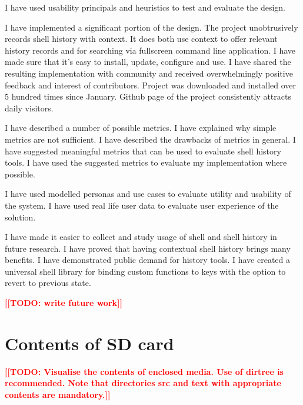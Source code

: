 \documentclass[thesis=M,english]{FITthesis}[2012/10/20]
\newcommand{\todotext}[1]{\textcolor{red}{\textbf{[[#1]]}}}
\begin{document}
\begin{conclusion}
I have used usability principals and heuristics to test and evaluate the design.

\par I have implemented a significant portion of the design. The project unobtrusively records shell history with context. It does both use context to offer relevant history records and for searching via fullscreen command line application.
I have made sure that it's easy to install, update, configure and use. I have shared the resulting implementation with community and received overwhelmingly positive feedback and interest of contributors. Project was downloaded and installed over 5 hundred times since January. Github page of the project consistently attracts daily visitors.  

\par I have described a number of possible metrics. I have explained why simple metrics are not sufficient. I have described the drawbacks of metrics in general. I have suggested meaningful metrics that can be used to evaluate shell history tools. I have used the suggested metrics to evaluate my implementation where possible. 

\par I have used modelled personas and use cases to evaluate utility and usability of the system.
I have used real life user data to evaluate user experience of the solution.


I have made it easier to collect and study usage of shell and shell history in future research.
I have proved that having contextual shell history brings many benefits. 
I have demonstrated public demand for history tools. 
I have created a universal shell library for binding custom functions to keys with the option to revert to previous state. 




\todotext{TODO: write future work}

\end{conclusion}




\appendix


\chapter{Contents of SD card}\label{app:SDcontent}

\todotext{TODO: Visualise the contents of enclosed media. Use of dirtree is recommended. Note that directories src and text with appropriate contents are mandatory.}
\end{document}
